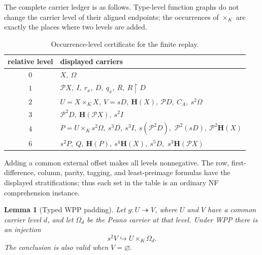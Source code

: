 \documentclass[11pt]{article}
\newtheorem{lemma}[theorem]{Lemma}
\numberwithin{equation}{section}
\theoremstyle{definition}
\theoremstyle{remark}
\newcommand{\Pow}{\mathcal P}
\newcommand{\inj}{\hookrightarrow}
\newcommand{\surj}{\twoheadrightarrow}
\begin{document}
The complete carrier ledger is as follows.  Type-level function graphs do
not change the carrier level of their aligned endpoints; the occurrences
of $\times_K$ are exactly the places where two levels are added.
\begin{table}[ht]
\centering
\caption{Occurrence-level certificate for the finite replay.}
\label{tab:intrinsic-certificate}
\begin{tabular}{@{}cl@{}}
\toprule
relative level & displayed carriers \\
\midrule
$0$ & $X,\ \Omega$ \\
$1$ & $\Pow X,\ I,\ r_x,\ D,\ q_x,\ R,\ R\mathbin{\upharpoonright}D$ \\
$2$ & $U=X\times_KX,\ V=sD,\ \mathbf H(X),\ \Pow D,\ C_A,\ s^2\Omega$ \\
$3$ & $\Pow^2D,\ \mathbf H(\Pow X),\ s^2I$ \\
$4$ & $P=U\times_Ks^2\Omega,\ s^3D,\ s^3I,\ s(\Pow^2D),$
       $\Pow^2(sD),\ \Pow^2\mathbf H(X)$ \\
$6$ & $s^2P,\ Q,\ \mathbf H(P),\ s^4\mathbf H(X),\ s^5D,$
       $s^3\mathbf H(\Pow X)$ \\
\bottomrule
\end{tabular}
\end{table}
Adding a common external offset makes all levels nonnegative.  The row,
first-difference, column, parity, tagging, and least-preimage formulas have
the displayed stratifications; thus each set in the table is an ordinary
NF comprehension instance.

\begin{lemma}[Typed WPP padding]
\label{lem:typed-wpp-padding}
Let $g:U\surj V$, where $U$ and $V$ have a common carrier level $d$, and
let $\Omega_d$ be the Peano carrier at that level.  Under WPP there is an
injection
\begin{equation}
 s^2V\inj U\times_K\Omega_d.
 \label{eq:typed-padding}
\end{equation}
The conclusion is also valid when $V=\varnothing$.
\end{lemma}
\end{document}
